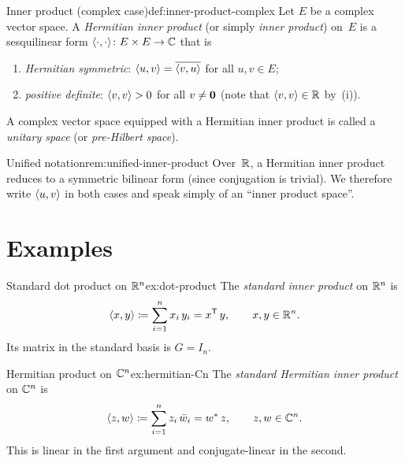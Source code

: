 \begin{definition}{Inner product (complex case)}{def:inner-product-complex}
Let $E$ be a complex vector space.  A \emph{Hermitian inner product}
(or simply \emph{inner product}) on~$E$ is a sesquilinear form
$\langle\cdot,\cdot\rangle\colon E\times E\to{\mathbb{C}}$ that is
\begin{enumerate}[label=(\roman*)]
  \item \emph{Hermitian symmetric}: $\langle u,v\rangle =
    \overline{\langle v,u\rangle}$ for all $u,v\in E$;
  \item \emph{positive definite}: $\langle v,v\rangle > 0$ for all
    $v\neq\mathbf{0}$ (note that $\langle v,v\rangle\in{\mathbb{R}}$ by~(i)).
\end{enumerate}
A complex vector space equipped with a Hermitian inner product is called
a \emph{unitary space} (or \emph{pre-Hilbert
space}).
\end{definition}

\begin{remark}{Unified notation}{rem:unified-inner-product}
Over~${\mathbb{R}}$, a Hermitian inner product reduces to a symmetric bilinear
form (since conjugation is trivial).  We therefore write
$\langle u,v\rangle$ in both cases and speak simply of an ``inner product
space''.
\end{remark}


\section{Examples}\label{sec:inner-product-examples}

\begin{example}{Standard dot product on ${\mathbb{R}}^n$}{ex:dot-product}
The \emph{standard inner product} on ${\mathbb{R}}^n$ is
\[
  \langle x,y\rangle \coloneqq \sum_{i=1}^n x_i\, y_i = {x}^{\mathsf{T}}\, y,
  \qquad x,y\in{\mathbb{R}}^n.
\]
Its matrix in the standard basis is $G = I_n$.
\end{example}

\begin{example}{Hermitian product on ${\mathbb{C}}^n$}{ex:hermitian-Cn}
The \emph{standard Hermitian inner product} on ${\mathbb{C}}^n$ is
\[
  \langle z,w\rangle \coloneqq \sum_{i=1}^n z_i\,\bar{w}_i = {w}^{*}\, z,
  \qquad z,w\in{\mathbb{C}}^n.
\]
This is linear in the first argument and conjugate-linear in the second.
\end{example}

